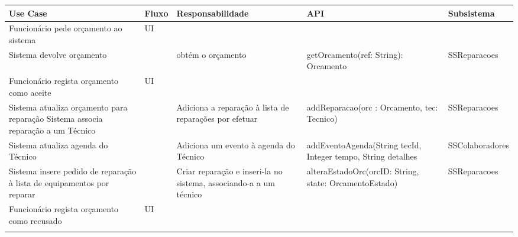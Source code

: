 \documentclass[../relatorio.tex]{subfiles}
\begin{document}
\begin{landscape}
    \begin{table}[!h]
        \centering
        \begin{tabular}{|p{5cm}|p{1cm}|p{4cm}|p{6cm}|p{3cm}|}
            \hline
            \rowcolor{gray!20!white}
            Use Case & Fluxo                                            & Responsabilidade & API & Subsistema \\
            \hline
            \rowcolor{yellow}
            Funcionário pede orçamento ao sistema
                     & UI
                     & 
                     & 
                     & 
            \\
            \hline
            Sistema devolve orçamento
                     & 
                     & obtém o orçamento
                     & getOrcamento(ref: String): Orcamento
                     & SSReparacoes
            \\
            \hline
            \rowcolor{yellow}
            Funcionário regista orçamento como aceite
                     & UI
                     & 
                     & 
                     & 
            \\
            \hline
            Sistema atualiza orçamento para reparação
            Sistema associa reparação a um Técnico 
                    & 
                    & Adiciona a reparação à lista de reparações por efetuar
                    & addReparacao(orc : Orcamento, tec: Tecnico)
                    & SSReparacoes
            \\
            \hline
            Sistema atualiza agenda do Técnico
                    & 
                    & Adiciona um evento à agenda do Técnico
                    & addEventoAgenda(String tecId, Integer tempo, String detalhes
                    & SSColaboradores
            \\
            \hline
            Sistema insere pedido de reparação à lista de equipamentos por reparar
                     & 
                     & Criar reparação e inseri-la no sistema, associando-a a um técnico
                     & alteraEstadoOrc(orcID: String, state: OrcamentoEstado)
                     & SSReparacoes
            \\
            \hline
            \rowcolor{yellow}
            Funcionário regista orçamento como recusado
                     & UI
                     & 
                     & 
                     & 
            \\
            \hline
            \rowcolor{red!30}

\end{tabular}
\end{table}
\end{landscape}
\end{document}

